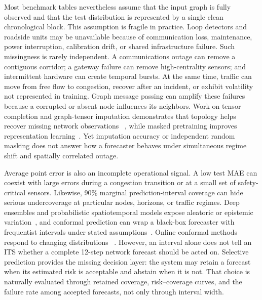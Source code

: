 \documentclass[pdflatex,sn-mathphys-num]{sn-jnl}
\begin{document}
Most benchmark tables nevertheless assume that the input graph is fully
observed and that the test distribution is represented by a single clean
chronological block. This assumption is fragile in practice. Loop detectors
and roadside units may be unavailable because of communication loss,
maintenance, power interruption, calibration drift, or shared infrastructure
failure. Such missingness is rarely independent. A communications outage can
remove a contiguous corridor; a gateway failure can remove high-centrality
sensors; and intermittent hardware can create temporal bursts. At the same
time, traffic can move from free flow to congestion, recover after an incident,
or exhibit volatility not represented in training. Graph message passing can
amplify these failures because a corrupted or absent node influences its
neighbors. Work on tensor completion and graph-tensor imputation demonstrates
that topology helps recover missing network observations
~\cite{baggag2021tensor,xu2023graphtensor}, while masked pretraining improves
representation learning~\cite{sun2023stmae,gao2024stdmae}. Yet imputation
accuracy or independent random masking does not answer how a forecaster behaves
under simultaneous regime shift and spatially correlated outage.

Average point error is also an incomplete operational signal. A low test MAE
can coexist with large errors during a congestion transition or at a small set
of safety-critical sensors. Likewise, 90\% marginal prediction-interval
coverage can hide serious undercoverage at particular nodes, horizons, or
traffic regimes. Deep ensembles and probabilistic spatiotemporal models expose
aleatoric or epistemic variation~\cite{wu2021uq,liu2024ensembleuq}, and
conformal prediction can wrap a black-box forecaster with frequentist
intervals under stated assumptions~\cite{stankeviciute2021conformal}. Online
conformal methods respond to changing distributions
~\cite{gibbs2024online,angelopoulos2024online}. However, an interval alone does
not tell an ITS whether a complete 12-step network forecast should be acted on.
Selective prediction provides the missing decision layer: the system may
retain a forecast when its estimated risk is acceptable and abstain when it is
not. That choice is naturally evaluated through retained coverage,
risk--coverage curves, and the failure rate among accepted forecasts, not only
through interval width.
\end{document}
